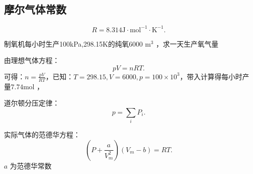 \subsection{摩尔气体常数}%
\label{sub:摩尔气体常数}
 \[
    R=8.314\text{J} \cdot \text{mol}^{-1} \cdot \text{K}^{-1}
.\]
\begin{eg}
    制氧机每小时生产100kPa,298.15K的纯氧6000 $\text{m}^{3}$ ，求一天生产氧气量
\end{eg}
\begin{sol}
    由理想气体方程：\[
        pV=nRT
    .\]可得：$n=\frac{pV}{RT}$，已知：$T=298.15, V=6000, p=100\times 10^{3}$，带入计算得每小时产量$7.74\text{mol}$ ，
\end{sol}
\begin{notation}
    道尔顿分压定律： \[
        p=\sum_{i}P_i
    .\]
\end{notation}
\begin{notation}
    实际气体的范德华方程：
    \[
        \left( P+\frac{a}{V_{m}^2 } \right)\left( V_{m}-b \right)=RT
    .\]
    $a$ 为范德华常数
\end{notation}
